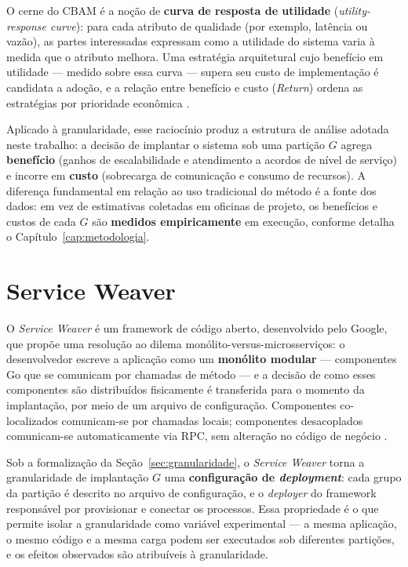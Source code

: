 O cerne do CBAM é a noção de \textbf{curva de resposta de utilidade} (\textit{utility-response curve}): para cada atributo de qualidade (por exemplo, latência ou vazão), as partes interessadas expressam como a utilidade do sistema varia à medida que o atributo melhora. Uma estratégia arquitetural cujo benefício em utilidade --- medido sobre essa curva --- supera seu custo de implementação é candidata a adoção, e a relação entre benefício e custo (\textit{Return}) ordena as estratégias por prioridade econômica \cite{asundi2001cbam}.

Aplicado à granularidade, esse raciocínio produz a estrutura de análise adotada neste trabalho: a decisão de implantar o sistema sob uma partição $G$ agrega \textbf{benefício} (ganhos de escalabilidade e atendimento a acordos de nível de serviço) e incorre em \textbf{custo} (sobrecarga de comunicação e consumo de recursos). A diferença fundamental em relação ao uso tradicional do método é a fonte dos dados: em vez de estimativas coletadas em oficinas de projeto, os benefícios e custos de cada $G$ são \textbf{medidos empiricamente} em execução, conforme detalha o Capítulo~\ref{cap:metodologia}.

\section{Service Weaver}
\label{sec:serviceweaver}

O \textit{Service Weaver} \cite{ghemawat2023serviceweaver} é um framework de código aberto, desenvolvido pelo Google, que propõe uma resolução ao dilema monólito-versus-microsserviços: o desenvolvedor escreve a aplicação como um \textbf{monólito modular} --- componentes Go que se comunicam por chamadas de método --- e a decisão de como esses componentes são distribuídos fisicamente é transferida para o momento da implantação, por meio de um arquivo de configuração. Componentes co-localizados comunicam-se por chamadas locais; componentes desacoplados comunicam-se automaticamente via RPC, sem alteração no código de negócio \cite{ghemawat2023serviceweaver}.

Sob a formalização da Seção~\ref{sec:granularidade}, o \textit{Service Weaver} torna a granularidade de implantação $G$ uma \textbf{configuração de \textit{deployment}}: cada grupo da partição é descrito no arquivo de configuração, e o \textit{deployer} do framework responsável por provisionar e conectar os processos. Essa propriedade é o que permite isolar a granularidade como variável experimental --- a mesma aplicação, o mesmo código e a mesma carga podem ser executados sob diferentes partições, e os efeitos observados são atribuíveis à granularidade.

